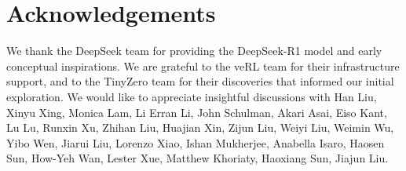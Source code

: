 



\section*{Acknowledgements}

We thank the DeepSeek team for providing the DeepSeek-R1 model and early conceptual inspirations. We are grateful to the veRL team for their infrastructure support, and to the TinyZero team for their discoveries that informed our initial exploration.
We would like to appreciate insightful discussions with Han Liu, Xinyu Xing, Monica Lam, Li Erran Li, John Schulman, Akari Asai, Eiso Kant, Lu Lu, Runxin Xu, Zhihan Liu, Huajian Xin, Zijun Liu, Weiyi Liu, Weimin Wu, Yibo Wen, Jiarui Liu, Lorenzo Xiao, Ishan Mukherjee, Anabella Isaro, Haosen Sun, How-Yeh Wan, Lester Xue, Matthew Khoriaty, Haoxiang Sun, Jiajun Liu.
